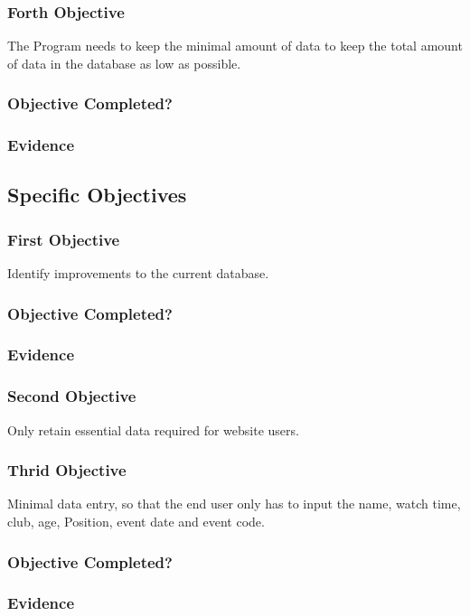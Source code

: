 \subsubsection{Forth Objective}
The Program needs to keep the minimal amount of data to keep the total amount of data in the database as low as possible.
\subsubsection{Objective Completed?}

\subsubsection{Evidence}

\subsection{Specific Objectives}
\subsubsection{First Objective}
Identify improvements to the current database.
\subsubsection{Objective Completed?}

\subsubsection{Evidence}

\subsubsection{Second Objective}
Only retain essential data required for website users.

\subsubsection{Thrid Objective}
Minimal data entry, so that the end user only has to input the name, watch time, club, age, Position, event date and event code.
\subsubsection{Objective Completed?}

\subsubsection{Evidence}
